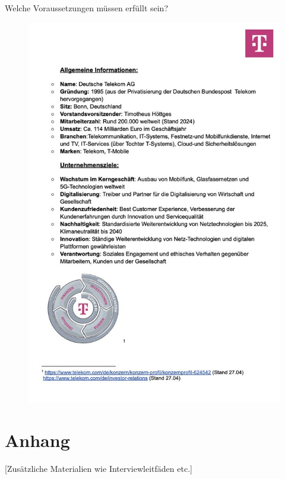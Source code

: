 \documentclass[12pt,a4paper]{article}
\begin{document}
	Welche Voraussetzungen müssen erfüllt sein?
	
	\newpage
	\printbibliography[heading=bibintoc,title={Literaturverzeichnis}]
	
	
	\newpage
	\thispagestyle{empty} %
	\begin{figure}[H]
		\centering
		\includegraphics{images/Bild1.jpg}
	\end{figure}
	\newpage
	\newpage
	\section{Anhang}
	[Zusätzliche Materialien wie Interviewleitfäden etc.]
	
\end{document}
